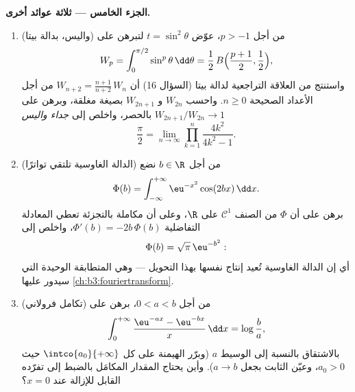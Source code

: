 \begin{problem}
\medskip
\noindent\textbf{الجزء الخامس --- ثلاثة عوائد أخرى.}
\begin{enumerate}[resume]
  \item (واليس، بدالة بيتا) من أجل $p > -1$، عوّض $t =
        \sin^2\theta$ لتبرهن
        على
        \[
        W_p = \int_0^{\pi/2}\sin^p\theta\,\dd\theta
        = \frac12\,B\Bigl(\frac{p+1}2, \frac12\Bigr),
        \]
        واستنتج من العلاقة التراجعية لدالة بيتا (السؤال 16) أن
        $W_{n+2} = \frac{n+1}{n+2}\,W_n$ من أجل الأعداد الصحيحة $n \geq
        0$. واحسب $W_{2n}$
        و $W_{2n+1}$ بصيغة مغلقة، وبرهن على $W_{2n+1}/W_{2n} \to 1$ بالحصر،
        واخلص إلى \emph{جداء واليس}
        \[
        \frac\pi2 = \lim_{n\to\infty}
        \prod_{k=1}^{n}\frac{4k^2}{4k^2 - 1} .
        \]
  \item (الدالة الغاوسية تلتقي تواترًا) من أجل $b \in \R$ نضع
        \[
        \Phi(b) = \int_{-\infty}^{+\infty}
        \eu^{-x^2}\cos(2bx)\,\dd x .
        \]
        برهن على أن $\Phi$ من الصنف $\mathcal C^1$ على $\R$، وعلى
        أن مكاملة بالتجزئة تعطي المعادلة التفاضلية $\Phi'(b) = -2b\,\Phi(b)$،
        واخلص إلى
        \[
        \Phi(b) = \sqrt\pi\,\eu^{-b^2} :
        \]
        أي إن الدالة الغاوسية تُعيد إنتاج نفسها بهذا التحويل ---
        وهي المتطابقة الوحيدة التي سيدور عليها \cref{ch:b3:fouriertransform}.
  \item (تكامل فرولاني) من أجل $0 < a < b$، برهن على
        \[
        \int_0^{+\infty}
        \frac{\eu^{-ax} - \eu^{-bx}}{x}\,\dd x
        = \log\frac ba ,
        \]
        بالاشتقاق بالنسبة إلى الوسيط $a$ (وبرّر الهيمنة على كل
        $\intco{a_0}{+\infty}$ حيث $a_0 > 0$، وعيّن الثابت بجعل $a \to b$).
        وأين يحتاج المقدار المكامَل بالضبط إلى تفرّده القابل
        للإزالة عند $x = 0$؟
\end{enumerate}
\end{problem}
